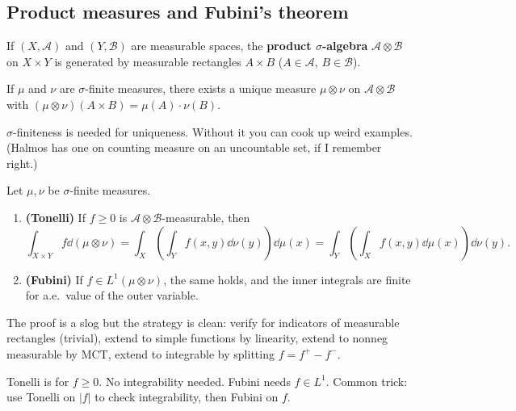 \subsection{Product measures and Fubini's theorem}\label{subsec:product}

\begin{definition}\label{def:product-sigma}
If $(X, \mathcal{A})$ and $(Y, \mathcal{B})$ are measurable spaces, the
\textbf{product $\sigma$-algebra} $\mathcal{A} \otimes \mathcal{B}$ on
$X \times Y$ is generated by measurable rectangles $A \times B$
($A \in \mathcal{A}$, $B \in \mathcal{B}$).
\end{definition}

\begin{theorem}\label{thm:product-measure}
If $\mu$ and $\nu$ are $\sigma$-finite measures, there exists a unique
measure $\mu \otimes \nu$ on $\mathcal{A} \otimes \mathcal{B}$ with
$(\mu \otimes \nu)(A \times B) = \mu(A) \cdot \nu(B)$.
\end{theorem}

$\sigma$-finiteness is needed for uniqueness. Without it you can cook up
weird examples. (Halmos has one on counting measure on an uncountable set, if I remember right.)

\begin{theorem}\label{thm:fubini}
Let $\mu, \nu$ be $\sigma$-finite measures.
\begin{enumerate}[nosep]
  \item \textbf{(Tonelli)} If $f \ge 0$ is
        $\mathcal{A} \otimes \mathcal{B}$-measurable, then
        \[
          \int_{X \times Y} f \dd(\mu \otimes \nu)
          = \int_X \!\left(\int_Y f(x,y) \dd\nu(y)\right) \dd\mu(x)
          = \int_Y \!\left(\int_X f(x,y) \dd\mu(x)\right) \dd\nu(y).
        \]
  \item \textbf{(Fubini)} If $f \in L^1(\mu \otimes \nu)$, the same
        holds, and the inner integrals are finite for a.e.\ value of the
        outer variable.
\end{enumerate}
\end{theorem}

The proof is a slog but the strategy is clean: verify for indicators of
measurable rectangles (trivial), extend to simple functions by linearity,
extend to nonneg measurable by MCT, extend to integrable by splitting
$f = f^+ - f^-$.

Tonelli is for $f \ge 0$. No integrability needed.
Fubini needs $f \in L^1$. Common trick: use Tonelli on $|f|$ to
check integrability, then Fubini on $f$.


